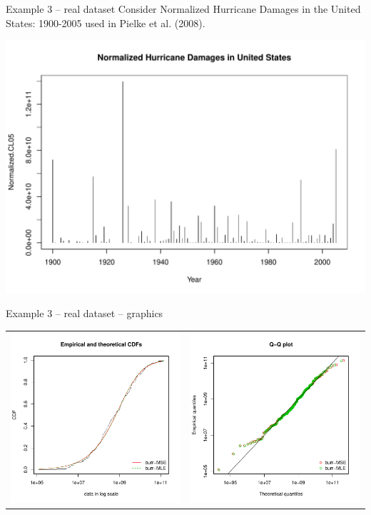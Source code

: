 \documentclass[8pt, hide notes]{beamer}
\begin{document}
\begin{frame}{Example 3 -- real dataset}
Consider Normalized Hurricane Damages in the United States: 1900-2005 used in Pielke et al. (2008).

\centering
\includegraphics[width=\textwidth]{img/Ushustorm}

\end{frame}



\begin{frame}{Example 3 -- real dataset -- graphics}

\begin{tabular}{cc}
\hspace{-.5cm}
\includegraphics[width=.55\textwidth]{img/Ushustorm-cdfcomp}&
\includegraphics[width=.55\textwidth]{img/Ushustorm-qqcomp}
\end{tabular}

\end{frame}
\end{document}
